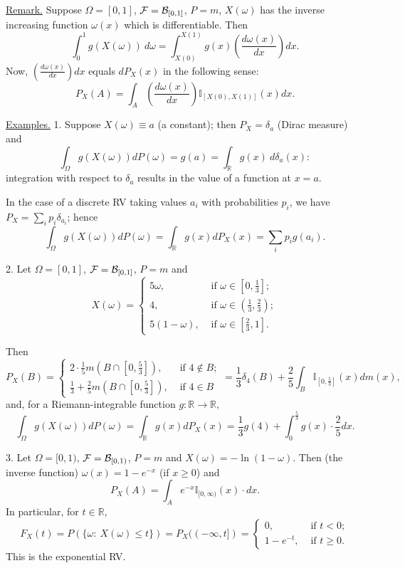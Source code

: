 \documentclass[a4paper,10pt]{article}
\def\RR{\mathbb{R}}
\def\II{\mathbb{I}}
\newcommand{\1}[1]{\mathbf{1}_{\{#1\}}}
\begin{document}
\underline{Remark.} Suppose $\Omega=[0,1]$, ${\cal F}={\cal B}_{[0,1]}$, $P=m$, $X(\omega)$ has the inverse increasing function $\omega(x)$ which is differentiable. Then
  $$\int_0^1 g(X(\omega))~d\omega=\int_{X(0)}^{X(1)} g(x) \left(\frac{d\omega(x)}{dx}\right) dx.$$
Now, $\left(\frac{d\omega(x)}{dx}\right) dx$ equals $dP_X(x)$ in the following sense:
  $$P_X(A)=\int_A \left(\frac{d\omega(x)}{dx}\right)\II_{[X(0),X(1)]}(x) dx.$$\vspace{3mm}

\underline{Examples.} 1. Suppose $X(\omega)\equiv a$ (a constant); then $P_X=\delta_a$ (Dirac measure) and
  $$\int_\Omega g(X(\omega)) dP(\omega)=g(a)=\int_\RR g(x)~d\delta_a(x):$$
integration with respect to $\delta_a$ results in the value of a function at $x=a$.

In the case of a discrete RV taking values  $a_i$ with probabilities $p_i$, we have $P_X=\sum_i p_i\delta_{a_i}$; hence
  $$\int_\Omega g(X(\omega)) dP(\omega)=\int_\RR g(x) dP_X(x)=\sum_i p_i g(a_i).$$

2. Let $\Omega=[0,1]$, ${\cal F}={\cal B}_{[0,1]}$, $P=m$ and
  $$X(\omega)=\left\{\begin{array}{rl}
5\omega, & \mbox{ if } \omega\in[0,\frac{1}{3}]; \\ 4, & \mbox{ if } \omega\in(\frac{1}{3},\frac{2}{3}); \\ 5(1-\omega), & \mbox{ if } \omega\in [\frac{2}{3},1]. \end{array} \right. $$ \vspace{4cm}

Then
  $$P_X(B)=\left\{\begin{array}{ll}
2\cdot\frac{1}{5} m(B\cap[0,\frac{5}{3}]), & \mbox{ if } 4\notin B; \\
\frac{1}{3}+\frac{2}{5} m(B\cap[0,\frac{5}{3}]), & \mbox{ if } 4\in B \end{array}\right. =\frac{1}{3}\delta_4(B)+\frac{2}{5}\int_B\II_{[0,\frac{5}{3}]}(x) dm(x),$$
and, for a Riemann-integrable function $g:\RR\to\RR$,
  $$\int_\Omega g(X(\omega)) dP(\omega)=\int_\RR g(x) dP_X(x)=\frac{1}{3} g(4)+\int_0^{\frac{5}{3}} g(x)\cdot \frac{2}{5} dx.$$

3. Let $\Omega=[0,1)$, ${\cal F}={\cal B}_{[0,1)}$, $P=m$ and $X(\omega)=-\ln(1-\omega)$. Then (the inverse function) $\omega(x)=1-e^{-x}$ (if $x\ge 0$) and
  $$P_X(A)=\int_A e^{-x}\II_{[0,\infty)}(x)\cdot dx.$$
In particular, for $t\in\RR$,
$$F_X(t)=P(\{\omega:~X(\omega)\le t\})=P_X((-\infty, t]) =\left\{\begin{array}{ll} 0, & \mbox{ if } t<0; \\ 1-e^{-t},& \mbox{ if } t\ge 0.\end{array}\right. $$
This is the exponential RV.\vspace{3mm}
\end{document}
